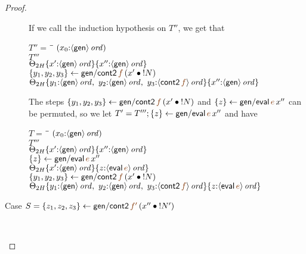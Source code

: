 \begin{proof}
\begin{description}
    \medskip
    If we 
    call the induction hypothesis on $T''$, we get that

\begin{tabbing}
$T'' = ~$ \= \qquad \= $(x_0{:}{\langle {\sf gen} \rangle}\,{{\it ord}})$
\\
\>$T'''$
\\
\>\>$     {
             {\Theta_{2H}}\{{x'{:}{\langle {{\sf gen}} \rangle}\,{{\it ord}}}\}}\{{x''{:}{\langle {{\sf gen}} \rangle}\,{{\it ord}}}\}$
\\
\>$\trstep{y_1, y_2, y_3}{{\sf gen/cont2}\,\lf{f}\,(\tfuser{x'}{\tbangr{N}})}$
\\
\>\>$     \tackon{
             \tackon{\Theta_{2H}}
                {y_1{:}\istrue{\susp{{\sf gen}}}, ~ 
                 y_2{:}\istrue{\susp{{\sf gen}}}, ~ 
                 y_3{:}\istrue{\susp{{\sf cont2}\,\lf{f}}}}}
             {x''{:}\istrue{\susp{{\sf gen}}}}$
\end{tabbing}

The steps $\trstep{y_1, y_2, y_3}{{\sf gen/cont2}\,\lf{f}\,(\tfuser{x'}{\tbangr{N}})}$
and $\trstep{z}{{\sf gen/eval}\,\lf{e}\,x''}$ can be permuted, so 
we let $T' = T'''; \trstep{z}{{\sf gen/eval}\,\lf{e}\,x''}$ and have

\begin{tabbing}
$T = ~$ \= \qquad \= $(x_0{:}{\langle {\sf gen} \rangle}\,{{\it ord}})$
\\
\>$T'''$
\\
\>\>$     {
             {\Theta_{2H}}\{{x'{:}{\langle {{\sf gen}} \rangle}\,{{\it ord}}}\}}\{{x''{:}{\langle {{\sf gen}} \rangle}\,{{\it ord}}}\}$
\\
\>$\trstep{z}{{\sf gen/eval}\,\lf{e}\,x''}$
\\
\>\>$     \tackon{
             \tackon{\Theta_{2H}}
                {x'{:}\istrue{\susp{{\sf gen}}}}}
             {z{:}\istrue{\susp{{\sf eval}\,\lf{e}}}}$
\\
\>$\trstep{y_1, y_2, y_3}{{\sf gen/cont2}\,\lf{f}\,(\tfuser{x'}{\tbangr{N}})}$
\\
\>\>$     \tackon{
             \tackon{\Theta_{2H}}
                {y_1{:}\istrue{\susp{{\sf gen}}}, ~ 
                 y_2{:}\istrue{\susp{{\sf gen}}}, ~ 
                 y_3{:}\istrue{\susp{{\sf cont2}\,\lf{f}}}}}
             {z{:}\istrue{\susp{{\sf eval}\,\lf{e}}}}$
\end{tabbing}

  \item[Case $S = \trstep{z_1, z_2, z_3}{{\sf gen/cont2}\,\lf{f'}\,(\tfuser{x''}{\tbangr{N'}})}$]~


\end{description}
\end{proof}
